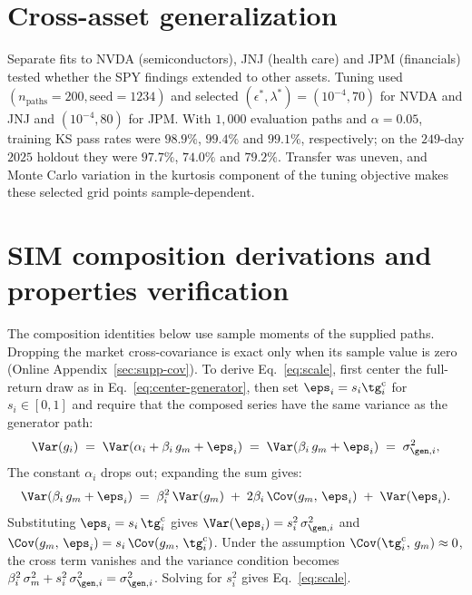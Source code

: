 \section{Cross-asset generalization}
\label{sec:supp-cross-asset}

Separate fits to NVDA (semiconductors), JNJ (health care) and JPM (financials) tested whether the SPY findings extended to other assets. Tuning used $(n_{\mathrm{paths}} = 200, \mathrm{seed} = 1234)$ and selected $(\epsilon^{*},\lambda^{*})=(10^{-4},70)$ for NVDA and JNJ and $(10^{-4},80)$ for JPM. With $1{,}000$ evaluation paths and $\alpha=0.05$, training KS pass rates were $98.9\%$, $99.4\%$ and $99.1\%$, respectively; on the $249$-day $2025$ holdout they were $97.7\%$, $74.0\%$ and $79.2\%$. Transfer was uneven, and Monte Carlo variation in the kurtosis component of the tuning objective makes these selected grid points sample-dependent.

\section{SIM composition derivations and properties verification}
\label{sec:supp-sim-derivations}

The composition identities below use sample moments of the supplied paths. Dropping the market cross-covariance is exact only when its sample value is zero (Online Appendix~\ref{sec:supp-cov}). To
derive Eq.~\eqref{eq:scale}, first center the full-return
draw as in Eq.~\eqref{eq:center-generator}, then set
$\eps_i=s_i\tg_i^{\mathrm c}$ for $s_i\in[0,1]$ and require
that the composed series have the same variance as the generator
path:
\begin{equation}
  \Var(g_i) \;=\; \Var(\alpha_i + \beta_i\, g_m + \eps_i)
            \;=\; \Var(\beta_i\, g_m + \eps_i)
            \;=\; \sigma_{\gen,i}^2,
\end{equation}
The constant $\alpha_i$ drops out; expanding the sum gives:
\begin{equation}
  \Var(\beta_i\, g_m + \eps_i) \;=\; \beta_i^2\, \Var(g_m)
  \;+\; 2 \beta_i\, \Cov(g_m,\, \eps_i)
  \;+\; \Var(\eps_i).
\end{equation}
Substituting $\eps_i = s_i\,\tg_i^{\mathrm c}$ gives
$\Var(\eps_i) = s_i^2\,\sigma_{\gen,i}^2$ and
$\Cov(g_m,\, \eps_i) = s_i\,\Cov(g_m,\, \tg_i^{\mathrm c})$. Under the
assumption $\Cov(\tg_i^{\mathrm c},\,g_m)\approx0$, the cross term vanishes and
the variance condition becomes
$\beta_i^2\, \sigma_m^2 + s_i^2\, \sigma_{\gen,i}^2 =
\sigma_{\gen,i}^2$. Solving for $s_i^2$ gives Eq.~\eqref{eq:scale}.

